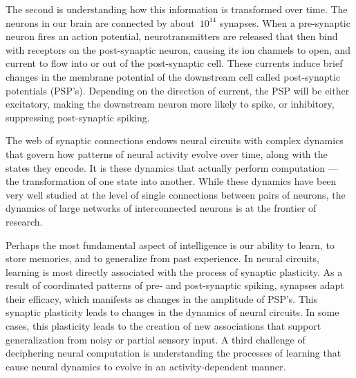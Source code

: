 The second is understanding how this information is transformed over
time. The neurons in our brain are connected by
about~$\text{10}^{\text{14}}$ synapses. When a pre-synaptic neuron
fires an action potential, neurotransmitters are released that then
bind with receptors on the post-synaptic neuron, causing its ion
channels to open, and current to flow into or out of the post-synaptic
cell. These currents induce brief changes in the membrane potential of
the downstream cell called post-synaptic potentials (PSP's). Depending
on the direction of current, the PSP will be either excitatory, making
the downstream neuron more likely to spike, or inhibitory, suppressing
post-synaptic spiking.


The web of synaptic connections endows neural circuits with complex
dynamics that govern how patterns of neural activity evolve over time,
along with the states they encode. It is these dynamics that actually
perform computation --- the transformation of one state into another.
While these dynamics have been very well studied at the level of
single connections between pairs of neurons, the dynamics of large
networks of interconnected neurons is at the frontier of research.

Perhaps the most fundamental aspect of intelligence is our ability to
learn, to store memories, and to generalize from past experience.  In
neural circuits, learning is most directly associated with the process
of synaptic plasticity. As a result of coordinated patterns of pre-
and post-synaptic spiking, synapses adapt their efficacy, which
manifests as changes in the amplitude of PSP's. This synaptic
  plasticity leads to changes in the dynamics of neural circuits.
In some cases, this plasticity leads to the creation of new associations
that support generalization from noisy or partial sensory input. 
A third challenge of deciphering neural computation is understanding
the processes of learning that cause neural dynamics to evolve in
an activity-dependent manner.

